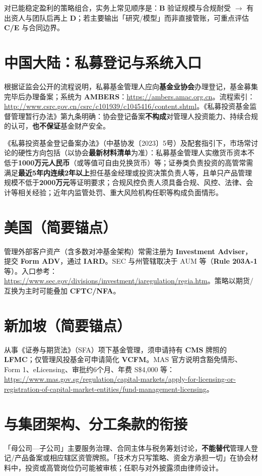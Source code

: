 对已能稳定盈利的策略组合，实务上常见顺序是：\textbf{B} 验证规模与合规耐受 $\rightarrow$ 有出资人与团队后再上 \textbf{D}；若主要输出「研究/模型」而非直接管账，可重点评估 \textbf{C/E} 与合同边界。

\section{中国大陆：私募登记与系统入口}

根据证监会公开的流程说明，私募基金管理人应向\textbf{基金业协会}办理登记，基金募集完毕后办理备案；系统为 \textbf{AMBERS}：\url{https://ambers.amac.org.cn}。流程索引：\url{http://www.csrc.gov.cn/csrc/c101939/c1045416/content.shtml}。《私募投资基金监督管理暂行办法》第九条明确：协会登记备案\textbf{不构成}对管理人投资能力、持续合规的认可，\textbf{也不保证}基金财产安全。

《私募投资基金登记备案办法》（中基协发〔2023〕5号）及配套指引下，市场常讨论的硬性方向包括（以协会\textbf{最新材料清单}为准）：私募基金管理人实缴货币资本不低于\textbf{1000万元人民币}（或等值可自由兑换货币）等；证券类负责投资的高管常需满足\textbf{最近5年内连续2年以上}担任基金经理或投资决策负责人等，且单只产品管理规模不低于\textbf{2000万元}等证明要求；合规风控负责人须具备合规、风控、法律、会计等相关经验；近年内监管处罚、重大风险机构任职等构成负面情形。

\section{美国（简要锚点）}

管理外部客户资产（含多数对冲基金架构）常需注册为 \textbf{Investment Adviser}，提交 \textbf{Form ADV}，通过 \textbf{IARD}。SEC 与州管辖取决于 AUM 等（\textbf{Rule 203A-1} 等）。入口参考：\url{https://www.sec.gov/divisions/investment/iaregulation/regia.htm}。策略以期货/互换为主时可能叠加 \textbf{CFTC/NFA}。

\section{新加坡（简要锚点）}

从事《证券与期货法》（SFA）项下基金管理，须申请持有 \textbf{CMS} 牌照的 \textbf{LFMC}；仅管理风投基金可申请简化 \textbf{VCFM}。MAS 官方说明含豁免情形、Form 1、eLicensing、审批约6个月、年费 S\$4{,}000 等：\url{https://www.mas.gov.sg/regulation/capital-markets/apply-for-licensing-or-registration-of-capital-market-entities/fund-management-licensing}。

\section{与集团架构、分工条款的衔接}

「母公司—子公司」主要服务治理、合同主体与税务筹划讨论，\textbf{不能替代}管理人登记/产品备案或相应辖区资管牌照。「技术方只写策略、资金方承担一切」在协会材料中，投资或高管岗位仍可能被审核；任职与对外披露须由律师设计。
